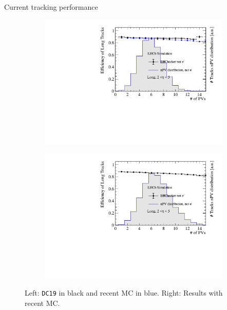\documentclass[xcolor={dvipsnames}]{beamer}
\begin{document}
\begin{frame}{Current tracking performance}
  \vspace{0.0cm}
  \begin{figure}[htb]
    \centering
    \begin{subfigure}{0.45\textwidth}
      \includegraphics[width=1\textwidth]{Plots/TrackEfficiency_nPV_old_new_MC_comparison.pdf}
    \end{subfigure}%
    \begin{subfigure}{0.45\textwidth}
      \includegraphics[width=1\textwidth]{Plots/TrackEfficiency_nPV_new_MC_comparison.pdf}
    \end{subfigure}
    \vspace{-0.2cm}
    \caption*{Left: \texttt{DC19} in black and recent MC in blue. Right: Results with recent MC.}
  \end{figure}
\end{frame}
\end{document}
